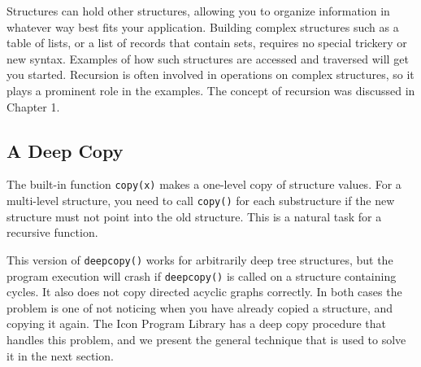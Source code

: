 Structures can hold other structures, allowing you to
organize information in whatever way best fits your application.
Building complex structures such as a table of lists, or a list
of records that contain sets, requires no special trickery or new
syntax. Examples of how such structures are accessed and
traversed will get you started. Recursion is often
involved in operations on complex structures, so it plays a prominent
role in the examples. The concept of recursion was discussed in Chapter
1.

\subsection*{A Deep Copy}

The built-in function \texttt{copy(x)} makes a one-level
copy of structure values. For a multi-level structure, you need to call
\texttt{copy()} for each substructure if the new structure must not
point into the old structure. This is a natural task for
a recursive function.


This version of \texttt{deepcopy()} works for
arbitrarily deep tree structures, but the program execution
will crash if \texttt{deepcopy()} is called on a structure containing
cycles. It also does not copy directed acyclic graphs correctly. In
both cases the problem is one of not noticing when you have already
copied a structure, and copying it again. The Icon Program Library has
a deep copy procedure that handles this problem, and we present the
general technique that is used to solve it in the next section.

